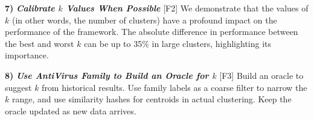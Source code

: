 \noindent \textbf{7)} \textbf{\textit{Calibrate $k$ Values When Possible}} [F2]
\newline
We demonstrate that the values of $k$ (in other words, the number of clusters) have a profound impact on the performance of the framework. The absolute difference in performance between the best and worst $k$ can be up to 35\% in large clusters, highlighting its importance.

\noindent \textbf{8)}  \textbf{\textit{Use AntiVirus Family to Build an Oracle for $k$}}  [F3] \newline
Build an oracle to suggest $k$ from historical results. Use family labels as a coarse filter to narrow the $k$ range, and use similarity hashes for centroids in actual clustering. Keep the oracle updated as new data arrives.

